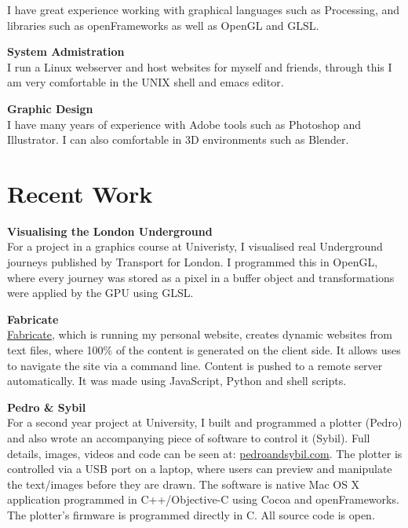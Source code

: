 \documentclass[margin,line,a4paper]{resume}
\begin{document}
\begin{resume}
I have great experience working with graphical languages such as Processing, and libraries such as openFrameworks as well as OpenGL and GLSL.

\textbf{System Admistration} \vspace{1mm} \\
I run a Linux webserver and host websites for myself and friends, through this I am very comfortable in the UNIX shell and emacs editor.

\textbf{Graphic Design} \vspace{1mm} \\
I have many years of experience with Adobe tools such as Photoshop and Illustrator. I can also comfortable in 3D environments such as Blender.

\section{\mysidestyle Recent Work}

\textbf{Visualising the London Underground} \vspace{1mm} \\
For a project in a graphics course at Univeristy, I visualised real Underground journeys published by Transport for London. I programmed this in OpenGL, where every journey was stored as a pixel in a buffer object and transformations were applied by the GPU using GLSL.

\textbf{Fabricate} \vspace{1mm} \\
\href{https://github.com/whg/fabricate}{Fabricate}, which is running my personal website, creates dynamic websites from text files, where 100\% of the content is generated on the client side. It allows uses to navigate the site via a command line. Content is pushed to a remote server automatically. It was made using JavaScript, Python and shell scripts.

\textbf{Pedro \& Sybil} \vspace{1mm} \\
For a second year project at University, I built and programmed a plotter (Pedro) and also wrote an accompanying piece of software to control it (Sybil). Full details, images, videos and code can be seen at: \href{http://pedroandsybil.com}{pedroandsybil.com}. The plotter is controlled via a USB port on a laptop, where users can preview and manipulate the text/images before they are drawn.  The software is native Mac OS X application programmed in C++/Objective-C using Cocoa and openFrameworks. The plotter’s firmware is programmed directly in C. All source code is open.


\end{resume}
\end{document}
